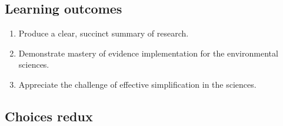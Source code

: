 \documentclass[
]{book}
\providecommand{\tightlist}{%
  \setlength{\itemsep}{0pt}\setlength{\parskip}{0pt}}
\begin{document}
\hypertarget{learning-outcomes-10}{%
\subsection*{Learning outcomes}\label{learning-outcomes-10}}

\begin{enumerate}
\def\labelenumi{\arabic{enumi}.}
\tightlist
\item
  Produce a clear, succinct summary of research.\\
\item
  Demonstrate mastery of evidence implementation for the environmental sciences.\\
\item
  Appreciate the challenge of effective simplification in the sciences.
\end{enumerate}

\hypertarget{choices-redux}{%
\subsection*{Choices redux}\label{choices-redux}}
\end{document}
